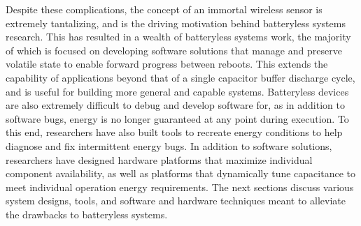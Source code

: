Despite these complications, the concept of an immortal wireless sensor is extremely tantalizing, and is the driving motivation behind batteryless systems research.
This has resulted in a wealth of batteryless systems work, the majority of which is focused on developing software solutions that manage and preserve volatile state to enable forward progress between reboots.
This extends the capability of applications beyond that of a single capacitor buffer discharge cycle, and is useful for building more general and capable systems.
Batteryless devices are also extremely difficult to debug and develop software for, as in addition to software bugs, energy is no longer guaranteed at any point during execution.
To this end, researchers have also built tools to recreate energy conditions to help diagnose and fix intermittent energy bugs.
In addition to software solutions, researchers have designed hardware platforms that maximize individual component availability, as well as platforms that dynamically tune capacitance to meet individual operation energy requirements.
The next sections discuss various system designs, tools, and software and hardware techniques meant to alleviate the drawbacks to batteryless systems.

